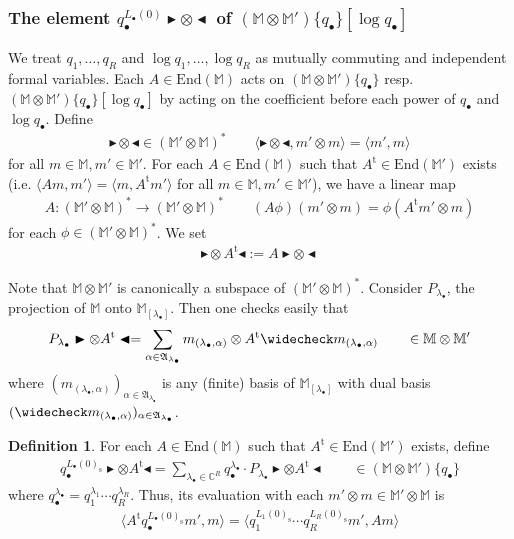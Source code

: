 \documentclass[11pt,b5paper,notitlepage]{article}
\theoremstyle{definition}
\newtheorem{df}{Definition}[section]
\theoremstyle{plain}
\newcommand{\fk}{\mathfrak}
\newcommand{\wch}{\widecheck}
\newcommand{\tr}{\mathrm{t}} %
\newcommand{\End}{\mathrm{End}} %
\newcommand{\blt}{\bullet}
\newcommand{\Mbb}{\mathbb M}
\newcommand{\Cbb}{\mathbb C}
\newcommand{\btl}{\blacktriangleleft}
\newcommand{\btr}{\blacktriangleright}
\newcommand{\<}{\left\langle}
\renewcommand{\>}{\right\rangle}
\newcommand{\bk}[1]{\langle {#1}\rangle}
\newcommand{\Lbss}{{L_\bullet(0)_\mathrm{s}}}
\numberwithin{equation}{section}
\begin{document}
\subsubsection{The element $q_\blt^{L_\blt(0)}\btr\otimes \btl$ of $(\Mbb\otimes\Mbb')\{q_\blt\}[\log q_\blt]$}

We treat $q_1,\dots,q_R$ and $\log q_1,\dots,\log q_R$ as mutually commuting and independent formal variables. Each $A\in\End(\Mbb)$ acts on $(\Mbb\otimes\Mbb')\{q_\blt\}$ resp. $(\Mbb\otimes\Mbb')\{q_\blt\}[\log q_\blt]$ by acting on the coefficient before each power of $q_\blt$ and $\log q_\blt$. Define
\begin{align*}
\btr\otimes\btl\in(\Mbb'\otimes\Mbb)^*\qquad\bk{\btr\otimes\btl,m'\otimes m}=\bk{m',m}
\end{align*}
for all $m\in\Mbb,m'\in\Mbb'$. For each $A\in\End(\Mbb)$ such that $A^\tr\in\End(\Mbb')$ exists (i.e. $\bk{Am,m'}=\bk{m,A^\tr m'}$ for all $m\in\Mbb,m'\in\Mbb'$), we have a linear map
\begin{align*}
A:(\Mbb'\otimes\Mbb)^*\rightarrow (\Mbb'\otimes\Mbb)^*\qquad (A\phi)(m'\otimes m)=\phi(A^\tr m'\otimes m)
\end{align*}
for each $\phi\in(\Mbb'\otimes\Mbb)^*$. We set
\begin{align*}
\btr\otimes A^\tr\btl:=A\btr\otimes\btl
\end{align*}

Note that $\Mbb\otimes\Mbb'$ is canonically a subspace of $(\Mbb'\otimes\Mbb)^*$. Consider $P_{\lambda_\blt}$, the projection of $\Mbb$ onto $\Mbb_{[\lambda_\blt]}$. Then one checks easily that
\begin{align}\label{eqb69}
P_{\lambda_\blt}\btr\otimes A^\tr\btl=\sum_{\alpha\in\fk A_{\lambda_\blt}} m_{(\lambda_\blt,\alpha)}\otimes A^\tr \wch m_{(\lambda_\blt,\alpha)}\qquad\in \Mbb\otimes\Mbb'
\end{align}
where $(m_{(\lambda_\blt,\alpha)})_{\alpha\in\fk A_{\lambda_\blt}}$ is any (finite) basis of $\Mbb_{[\lambda_\blt]}$ with dual basis $(\wch m_{(\lambda_\blt,\alpha)})_{\alpha\in\fk A_{\lambda_\blt}}$.




\begin{df}
For each $A\in\End(\Mbb)$ such that $A^\tr\in\End(\Mbb')$ exists, define
\begin{gather*}
q_\blt^\Lbss\btr\otimes A^\tr\btl=\sum_{\lambda_\blt\in\Cbb^R} q_\blt^{\lambda_\blt}\cdot P_{\lambda_\blt}\btr\otimes A^\tr\btl\qquad \in(\Mbb\otimes\Mbb')\{q_\blt\}
\end{gather*}
where $q_\blt^{\lambda_\blt}=q_1^{\lambda_1}\cdots q_R^{\lambda_R}$. Thus, its evaluation with each $m'\otimes m\in\Mbb'\otimes\Mbb$ is
\begin{align*}
\bk{A^\tr q_\blt^{\Lbss}m',m}=\bk{q_1^{L_1(0)_{\mathrm s}}\cdots q_R^{L_R(0)_{\mathrm s}}m',Am}
\end{align*}
\end{df}
\end{document}
